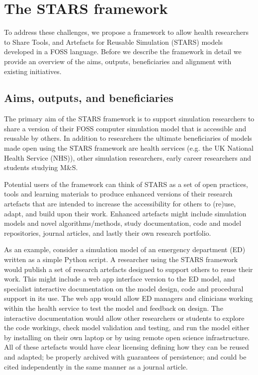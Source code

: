 \documentclass[]{interact}
\theoremstyle{plain}%
\theoremstyle{definition}
\theoremstyle{remark}
\begin{document}
 



\section{The STARS framework}

To address these challenges, we propose a framework to allow health researchers to Share Tools, and Artefacts for Reusable Simulation (STARS) models developed in a FOSS language. Before we describe the framework in detail we provide an overview of the aims, outputs, beneficiaries and alignment with existing initiatives.

\subsection{Aims, outputs, and beneficiaries}

The primary aim of the STARS framework is to support simulation researchers to share a version of their FOSS computer simulation model that is accessible and reusable by others. In addition to researchers the ultimate beneficiaries of models made open using the STARS framework are health services (e.g. the UK National Health Service (NHS)), other simulation researchers, early career researchers and students studying M\&S.

Potential users of the framework can think of STARS as a set of open practices, tools and learning materials to produce enhanced versions of their research artefacts that are intended to increase the accessibility for others to (re)use, adapt, and build upon their work. Enhanced artefacts might include simulation models and novel algorithms/methods, study documentation, code and model repositories, journal articles, and lastly their own research portfolio. 

As an example, consider a simulation model of an emergency department (ED) written as a simple Python script.  A researcher using the STARS framework would publish a set of research artefacts designed to support others to reuse their work. This might include a web app interface version to the ED model, and specialist interactive documentation on the model design, code and procedural support in its use. The web app would allow ED managers and clinicians working within the health service to test the model and feedback on design. The interactive documentation would allow other researchers or students to explore the code workings, check model validation and testing, and run the model either by installing on their own laptop or by using remote open science infrastructure.  All of these artefacts would have clear licensing defining how they can be reused and adapted; be properly archived with guarantees of persistence; and could be cited independently in the same manner as a journal article. 
\end{document}
